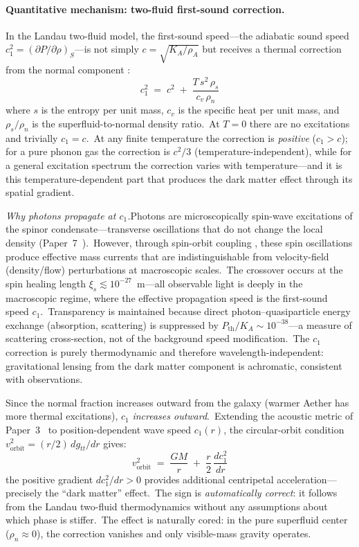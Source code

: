﻿\documentclass[12pt,letterpaper]{article}
\newcommand{\rhoa}{\rho_{\!A}}
\newcommand{\Ka}{K_{\!A}}
\begin{document}
\paragraph{Quantitative mechanism: two-fluid first-sound correction.}
In the Landau two-fluid model, the first-sound speed---the adiabatic
sound speed $c_1^2 = (\partial P/\partial\rho)_S$---is not simply $c =
\sqrt{\Ka/\rhoa}$ but receives a thermal correction from the normal
component \cite{berezhiani2015}:
%
\begin{equation}
  c_1^2 \;=\; c^2 \;+\; \frac{T\,s^2\,\rho_s}{c_v\,\rho_n}
  \label{eq:first-sound}
\end{equation}
%
where $s$ is the entropy per unit mass, $c_v$ is the specific heat per unit
mass, and $\rho_s/\rho_n$ is the superfluid-to-normal density ratio.\ At
$T = 0$ there are no excitations and trivially $c_1 = c$.\ At any finite
temperature the correction is \emph{positive} ($c_1 > c$); for a pure phonon
gas the correction is $c^2/3$ (temperature-independent), while for a general
excitation spectrum the correction varies with temperature---and it is this
temperature-dependent part that produces the dark matter effect through its
spatial gradient.

\emph{Why photons propagate at $c_1$.}\quad Photons are microscopically
spin-wave excitations of the spinor condensate---transverse oscillations
that do not change the local density (Paper~7~\cite{otto-quantum}).\ However,
through spin-orbit coupling \cite{volovik2003}, these spin oscillations
produce effective mass currents that are indistinguishable from velocity-field
(density/flow) perturbations at macroscopic scales.\ The crossover occurs at
the spin healing length $\xi_s \lesssim 10^{-27}$~m---all observable light is
deeply in the macroscopic regime, where the effective propagation speed is the
first-sound speed $c_1$.\ Transparency is maintained because direct
photon--quasiparticle energy exchange (absorption, scattering) is suppressed
by $P_{\mathrm{th}}/\Ka \sim 10^{-38}$---a measure of scattering cross-section,
not of the background speed modification.\ The $c_1$ correction is purely
thermodynamic and therefore wavelength-independent: gravitational lensing from
the dark matter component is achromatic, consistent with observations.

Since the normal fraction increases outward from the galaxy (warmer Aether has
more thermal excitations), $c_1$ \emph{increases outward}.\ Extending the
acoustic metric of Paper~3~\cite{otto-gravity} to position-dependent
wave speed $c_1(r)$, the circular-orbit condition $v_{\mathrm{orbit}}^2 =
(r/2)\,dg_{tt}/dr$ gives:
%
\begin{equation}
  v_{\mathrm{orbit}}^2 \;=\; \frac{GM}{r}
    \;+\; \frac{r}{2}\,\frac{dc_1^2}{dr}
  \label{eq:vorbit-DM}
\end{equation}
%
the positive gradient $dc_1^2/dr > 0$ provides additional centripetal
acceleration---precisely the ``dark matter'' effect.\ The sign is
\emph{automatically correct}: it follows from the Landau two-fluid
thermodynamics without any assumptions about which phase is stiffer.\ The
effect is naturally cored: in the pure superfluid center ($\rho_n \approx 0$),
the correction vanishes and only visible-mass gravity operates.
\end{document}
